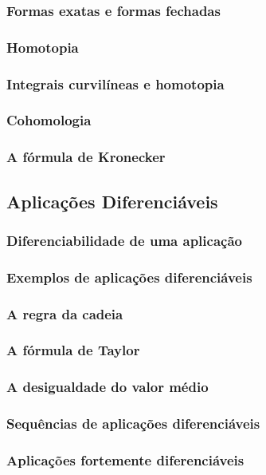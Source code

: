 \documentclass{article}
\theoremstyle{theorem}
\theoremstyle{lemma}
\theoremstyle{definition}
\theoremstyle{remark}
\begin{document}
   \subsubsection{Formas exatas e formas fechadas}
   \subsubsection{Homotopia}
   \subsubsection{Integrais curvilíneas e homotopia}
   \subsubsection{Cohomologia}
   \subsubsection{ A fórmula de Kronecker}
\subsection{ Aplicações Diferenciáveis}
   \subsubsection{Diferenciabilidade de uma aplicação}
   \subsubsection{Exemplos de aplicações diferenciáveis}
   \subsubsection{A regra da cadeia}
   \subsubsection{A fórmula de Taylor}
   \subsubsection{A desigualdade do valor médio}
   \subsubsection{Sequências de aplicações diferenciáveis}
   \subsubsection{Aplicações fortemente diferenciáveis}
\end{document}
